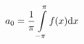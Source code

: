 \documentclass[preview]{standalone}
\begin{document}
\begin{center}
\[ a_0=\frac{1}{\pi}\int\limits_{-\pi}^{\pi}f(x){\rm d}x \]
\end{center}
\end{document}
